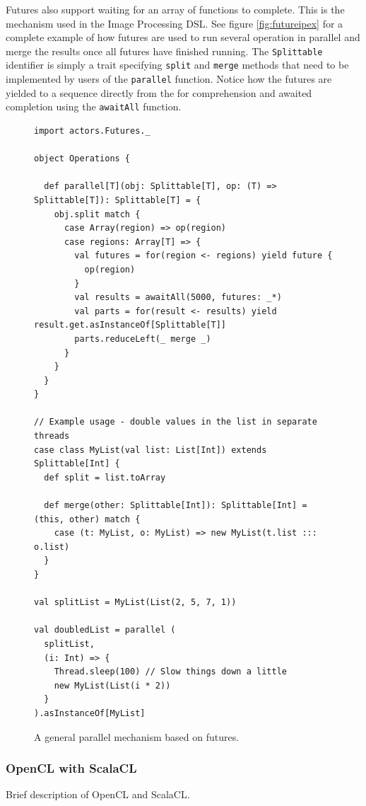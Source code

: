 \documentclass[a4paper,english]{report}
\begin{document}
Futures also support waiting for an array of functions to
complete. This is the mechanism used in the Image Processing DSL. See
figure \vref{fig:futureipex} for a complete example of how futures are
used to run several operation in parallel and merge the results once
all futures have finished running. The \texttt{Splittable} identifier
is simply a trait specifying \texttt{split} and \texttt{merge} methods
that need to be implemented by users of the \texttt{parallel}
function. Notice how the futures are yielded to a sequence directly
from the for comprehension and awaited completion using the
\texttt{awaitAll} function.

\begin{figure}
  \begin{lstlisting}
import actors.Futures._

object Operations {

  def parallel[T](obj: Splittable[T], op: (T) => Splittable[T]): Splittable[T] = {
    obj.split match {
      case Array(region) => op(region)
      case regions: Array[T] => {
        val futures = for(region <- regions) yield future {
          op(region)
        }
        val results = awaitAll(5000, futures: _*)
        val parts = for(result <- results) yield result.get.asInstanceOf[Splittable[T]]
        parts.reduceLeft(_ merge _)
      }
    }
  }
}

// Example usage - double values in the list in separate threads
case class MyList(val list: List[Int]) extends Splittable[Int] {
  def split = list.toArray
  
  def merge(other: Splittable[Int]): Splittable[Int] = (this, other) match {
    case (t: MyList, o: MyList) => new MyList(t.list ::: o.list)
  }
}

val splitList = MyList(List(2, 5, 7, 1))

val doubledList = parallel (
  splitList,
  (i: Int) => {
    Thread.sleep(100) // Slow things down a little
    new MyList(List(i * 2))
  }
).asInstanceOf[MyList]
  \end{lstlisting}
  \caption{A general parallel mechanism based on
    futures.\label{fig:futureipex}}
\end{figure}

\subsubsection{OpenCL with ScalaCL}
\label{sec:opencl}

Brief description of OpenCL\cite{opencl} and ScalaCL\cite{scalacl}.
\end{document}
